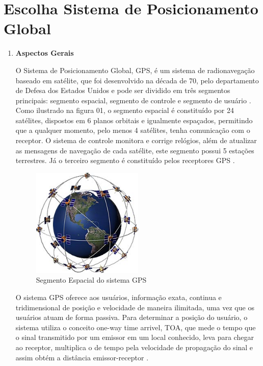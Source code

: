 \chapter[Escolha GPS]{Escolha Sistema de Posicionamento Global}
\begin{enumerate}
\item \textbf{Aspectos Gerais}

O Sistema de Posicionamento Global, GPS, é um sistema de radionavegação
baseado em satélite, que foi desenvolvido na década de 70, pelo departamento
de Defesa dos Estados Unidos e pode ser dividido em três segmentos principais:
segmento espacial, segmento de controle e segmento de usuário \cite{interferidores_gps}.
Como ilustrado na figura 01, o segmento espacial é constituído por
24 satélites, dispostos em 6 planos orbitais e igualmente espaçados,
permitindo que a qualquer momento, pelo menos 4 satélites, tenha
comunicação com o receptor. O sistema de controle monitora e corrige
relógios, além de atualizar as mensagens de navegação de cada satélite,
este segmento possui 5 estações terrestres. Já o terceiro segmento é
constituído pelos receptores GPS \cite{posicionamento_gnss}.

\begin{figure}[h]
  \centering
  \includegraphics[width=200px, scale=1]{figuras/esquema_gps}
  \caption{Segmento Espacial do sistema GPS \cite{entendendo_gps}}
\label{fig:esquema_gps}
\end{figure}

O sistema GPS oferece aos usuários, informação exata, continua e
tridimensional de posição e velocidade de maneira ilimitada, uma
vez que os usuários atuam de forma passiva. Para determinar a posição
do usuário, o sistema utiliza o conceito one-way time arrivel, TOA, que
mede o tempo que o sinal transmitido por um emissor em um local conhecido,
leva para chegar ao receptor, multiplica o de tempo pela velocidade de
propagação do sinal e assim obtém a distância emissor-receptor \cite{sobre_gps}.


\end{enumerate}
